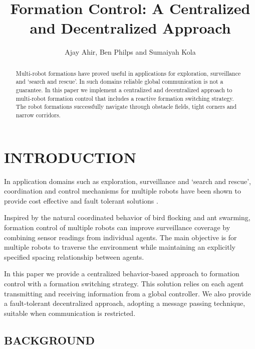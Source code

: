 \documentclass[letterpaper, 10 pt, conference]{ieeeconf}  %
\title{\LARGE \bf Formation Control: A Centralized and Decentralized Approach}
\author{Ajay Ahir, Ben Philps and Sumaiyah Kola}
\begin{document}
\maketitle
\thispagestyle{empty}
\pagestyle{empty}

\begin{abstract}
	
Multi-robot formations have proved useful in applications for exploration, surveillance and `search and rescue'. In such domains reliable global communication is not a guarantee. In this paper we implement a centralized and decentralized approach to multi-robot formation control that includes a reactive formation switching strategy. The robot formations successfully navigate through obstacle fields, tight corners and narrow corridors.

\end{abstract}
	
\section{INTRODUCTION}
	
In application domains such as exploration, surveillance and `search and rescue', coordination and control mechanisms for multiple robots have been shown to provide cost effective and fault tolerant solutions \cite{c1}.

Inspired by the natural coordinated behavior of bird flocking and ant swarming, formation control of multiple robots can improve surveillance coverage by combining sensor readings from individual agents. The main objective is for multiple robots to traverse the environment while maintaining an explicitly specified spacing relationship between agents.

In this paper we provide a centralized behavior-based approach to formation control with a formation switching strategy. This solution relies on each agent transmitting and receiving information from a global controller. We also provide a fault-tolerant decentralized approach, adopting a message passing technique, suitable when communication is restricted.

\subsection{BACKGROUND}
\label{background}
\end{document}
